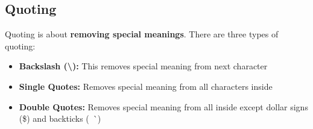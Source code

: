 \documentclass{report}
\begin{document}
    \subsection{Quoting}
    \bigbreak \noindent 
    \begin{concept}
		 Quoting is about \textbf{removing special meanings}. There are three types of quoting:
	\end{concept}
    \begin{itemize}
        \item \textbf{Backslash (\textbackslash):} This removes special meaning from next character
        \item \textbf{Single Quotes:} Removes special meaning from all characters inside
        \item \textbf{Double Quotes:} Removes special meaning from all inside except dollar signs (\$) and backticks (\ \`\ )
    \end{itemize}

    \pagebreak \bigbreak \noindent 
\end{document}
